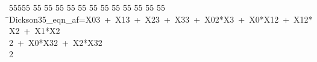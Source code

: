 %
%
\begin{tabbing}
55555 \= 55 \= 55 \= 55 \= 55 \= 55 \= 55 \= 55 \= 55 \= 55 \= 55 \= 55 \= 55 \= \>Dickson35\_eqn\_af=X03\ +\ X13\ +\ X23\ +\ X33\ +\ X02*X3\ +\ X0*X12\ +\ X12*X2\ +\ X1*X2\\[0pt]
\>2\ +\ X0*X32\ +\ X2*X32\\[0pt]
2\>\end{tabbing}
